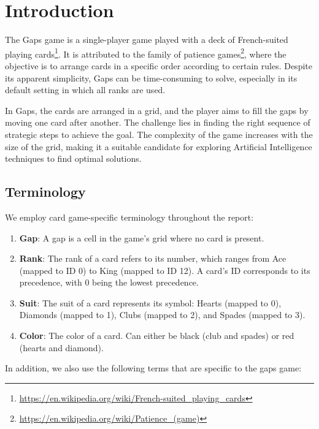 \chapter{Introduction}
The Gaps game is a single-player game played with a deck of French-suited playing cards\footnote{\url{https://en.wikipedia.org/wiki/French-suited_playing_cards}}. It is attributed to the family of patience games\footnote{\url{https://en.wikipedia.org/wiki/Patience_(game)}}, where the objective is to arrange cards in a specific order according to certain rules. Despite its apparent simplicity, Gaps can be time-consuming to solve, especially in its default setting in which all ranks are used.

In Gaps, the cards are arranged in a grid, and the player aims to fill the gaps by moving one card after another. The challenge lies in finding the right sequence of strategic steps to achieve the goal. The complexity of the game increases with the size of the grid, making it a suitable candidate for exploring Artificial Intelligence techniques to find optimal solutions.


\section{Terminology}
We employ card game-specific terminology throughout the report:

\begin{enumerate}
    \item \textbf{Gap}: A gap is a cell in the game's grid where no card is present.
    \item \textbf{Rank}: The rank of a card refers to its number, which ranges from Ace (mapped to ID 0) to King (mapped to ID 12).
    A card's ID corresponds to its precedence, with 0 being the lowest precedence.
    \item \textbf{Suit}: The suit of a card represents its symbol: Hearts (mapped to 0), Diamonds (mapped to 1), Clubs (mapped to 2), and Spades (mapped to 3).
    \item \textbf{Color}: The color of a card. 
    Can either be black (club and spades) or red (hearts and diamond).
\end{enumerate}

In addition, we also use the following terms that are specific to the gaps game:

